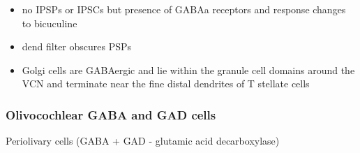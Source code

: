 



\begin{itemize}
\item no IPSPs or IPSCs but presence of GABAa receptors and response changes to bicuculine \citep{WuOertel:1986,OertelWickesberg:1993,FerragamoGoldingEtAl:1998a}
\item dend filter obscures PSPs
\item Golgi cells are GABAergic and lie within the granule cell domains around the VCN and terminate near the fine distal dendrites of T stellate cells
\end{itemize}

\subsubsection{Olivocochlear GABA and GAD cells}

 Periolivary cells (GABA + GAD - glutamic acid decarboxylase)

